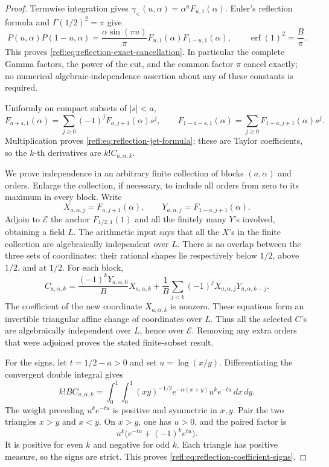 \documentclass[11pt,a4paper]{article}
\newcommand{\E}{\mathcal E}
\theoremstyle{definition}
\theoremstyle{remark}
\numberwithin{equation}{section}
\begin{document}
\begin{proof}
Termwise integration gives
\(\gamma_{<}(u,\alpha)=\alpha^uF_{u,1}(\alpha)\).
Euler's reflection formula \cite[\S5.5]{DLMF} and \(\Gamma(1/2)^2=\pi\) give
\[
 P(u,\alpha)P(1-u,\alpha)
 =\frac{\alpha\sin(\pi u)}\pi
 F_{u,1}(\alpha)F_{1-u,1}(\alpha),\qquad
 \operatorname{erf}(1)^2=\frac B\pi.
\]
This proves \eqref{refl:eq:reflection-exact-cancellation}. In particular the
complete Gamma factors, the power of the cut, and the common factor
\(\pi\) cancel exactly; no numerical algebraic-independence assertion
about any of these constants is required.

Uniformly on compact subsets of \(|s|<a\),
\[
 F_{a+s,1}(\alpha)=\sum_{j\geq0}(-1)^j
 F_{a,j+1}(\alpha)s^j,
 \qquad
 F_{1-a-s,1}(\alpha)=\sum_{j\geq0}
 F_{1-a,j+1}(\alpha)s^j.
\]
Multiplication proves \eqref{refl:eq:reflection-jet-formula}; these are
Taylor coefficients, so the \(k\)-th derivatives are \(k!C_{a,\alpha,k}\).

We prove independence in an arbitrary finite collection of blocks
\((a,\alpha)\) and orders. Enlarge the collection, if necessary, to
include all orders from zero to its maximum in every block. Write
\[
 X_{a,\alpha,j}=F_{a,j+1}(\alpha),\qquad
 Y_{a,\alpha,j}=F_{1-a,j+1}(\alpha).
\]
Adjoin to \(\E\) the anchor
\(F_{1/2,1}(1)\) and all the finitely many \(Y\)'s involved, obtaining
a field \(L\). The arithmetic input says that all the \(X\)'s in the
finite collection are algebraically independent over \(L\). There is
no overlap between the three sets of coordinates: their rational shapes
lie respectively below \(1/2\), above \(1/2\), and at \(1/2\).
For each block,
\[
 C_{a,\alpha,k}
 =\frac{(-1)^kY_{a,\alpha,0}}B X_{a,\alpha,k}
   +\frac1B\sum_{j<k}(-1)^jX_{a,\alpha,j}Y_{a,\alpha,k-j}.
\]
The coefficient of the new coordinate \(X_{a,\alpha,k}\) is nonzero.
These equations form an invertible triangular affine change of
coordinates over \(L\). Thus all the selected \(C\)'s are algebraically
independent over \(L\), hence over \(\E\). Removing any
extra orders that were adjoined proves the stated finite-subset result.

For the signs, let \(t=1/2-a>0\) and set
\(u=\log(x/y)\). Differentiating the convergent double integral gives
\[
 k! B C_{a,\alpha,k}
 =\int_0^1\!\int_0^1
 (xy)^{-1/2} e^{-\alpha(x+y)}u^k e^{-tu}\,dx\,dy.
\]
The weight preceding \(u^k e^{-tu}\) is positive and symmetric in
\(x,y\). Pair the two triangles \(x>y\) and \(x<y\).
On \(x>y\), one has \(u>0\), and the paired factor is
\[
 u^k\bigl(e^{-tu}+(-1)^ke^{tu}\bigr).
\]
It is positive for even \(k\) and negative for odd \(k\). Each triangle
has positive measure, so the signs are strict. This proves
\eqref{refl:eq:reflection-coefficient-signs}.
\end{proof}
\end{document}
